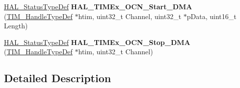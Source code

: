\begin{DoxyCompactItemize}
\item 
\mbox{\label{group___t_i_m_ex___exported___functions___group2_gacf9eba45624d72a463fd0f950cf72964}} 
\hyperlink{stm32f0xx__hal__def_8h_a63c0679d1cb8b8c684fbb0632743478f}{H\+A\+L\+\_\+\+Status\+Type\+Def} {\bfseries H\+A\+L\+\_\+\+T\+I\+M\+Ex\+\_\+\+O\+C\+N\+\_\+\+Start\+\_\+\+D\+MA} (\hyperlink{struct_t_i_m___handle_type_def}{T\+I\+M\+\_\+\+Handle\+Type\+Def} $\ast$htim, uint32\+\_\+t Channel, uint32\+\_\+t $\ast$p\+Data, uint16\+\_\+t Length)
\item 
\mbox{\label{group___t_i_m_ex___exported___functions___group2_ga09216649456d28828492740232b275fd}} 
\hyperlink{stm32f0xx__hal__def_8h_a63c0679d1cb8b8c684fbb0632743478f}{H\+A\+L\+\_\+\+Status\+Type\+Def} {\bfseries H\+A\+L\+\_\+\+T\+I\+M\+Ex\+\_\+\+O\+C\+N\+\_\+\+Stop\+\_\+\+D\+MA} (\hyperlink{struct_t_i_m___handle_type_def}{T\+I\+M\+\_\+\+Handle\+Type\+Def} $\ast$htim, uint32\+\_\+t Channel)
\end{DoxyCompactItemize}


\subsection{Detailed Description}

